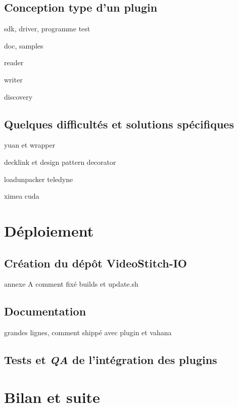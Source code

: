 \subsection{Conception type d'un plugin}
sdk, driver, programme test

doc, samples

reader

writer

discovery

\subsection{Quelques difficultés et solutions spécifiques}
yuan et wrapper

decklink et design pattern decorator

loadunpacker teledyne

ximea cuda


\section{Déploiement}
\subsection{Création du dépôt VideoStitch-IO}
annexe A
comment fixé builds et update.sh

\subsection{Documentation}
grandes lignes, comment shippé avec plugin et vahana

\subsection{Tests et \textit{QA} de l'intégration des plugins}


\section{Bilan et suite}

